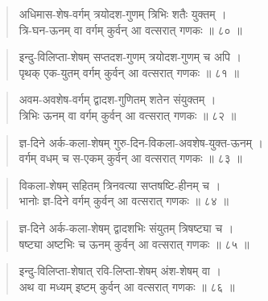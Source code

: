 \documentclass[11pt,a4paper]{article}
\newenvironment{shloka}{\begin{verse}\devanagarifont\large}{\end{verse}}
\begin{document}
\begin{shloka}
अधिमास-शेष-वर्गम् त्रयोदश-गुणम् त्रिभिः शतैः युक्तम् ।\\
त्रि-घन-ऊनम् वा वर्गम् कुर्वन् आ वत्सरात् गणकः ॥ ८० ॥
\end{shloka}

\vspace{0.3cm}

\begin{shloka}
इन्दु-विलिप्ता-शेषम् सप्तदश-गुणम् त्रयोदश-गुणम् च अपि ।\\
पृथक् एक-युतम् वर्गम् कुर्वन् आ वत्सरात् गणकः ॥ ८१ ॥
\end{shloka}

\vspace{0.3cm}

\begin{shloka}
अवम-अवशेष-वर्गम् द्वादश-गुणितम् शतेन संयुक्तम् ।\\
त्रिभिः ऊनम् वा वर्गम् कुर्वन् आ वत्सरात् गणकः ॥ ८२ ॥
\end{shloka}

\newpage

\vspace{0.3cm}

\begin{shloka}
ज्ञ-दिने अर्क-कला-शेषम् गुरु-दिन-विकला-अवशेष-युक्त-ऊनम् ।\\
वर्गम् वधम् च स-एकम् कुर्वन् आ वत्सरात् गणकः ॥ ८३ ॥
\end{shloka}

\vspace{0.3cm}

\begin{shloka}
विकला-शेषम् सहितम् त्रिनवत्या सप्तषष्टि-हीनम् च ।\\
भानोः ज्ञ-दिने वर्गम् कुर्वन् आ वत्सरात् गणकः ॥ ८४ ॥
\end{shloka}

\vspace{0.3cm}

\begin{shloka}
ज्ञ-दिने अर्क-कला-शेषम् द्वादशभिः संयुतम् त्रिषष्ट्या च ।\\
षष्ट्या अष्टभिः च ऊनम् कुर्वन् आ वत्सरात् गणकः ॥ ८५ ॥
\end{shloka}

\vspace{0.3cm}

\begin{shloka}
इन्दु-विलिप्ता-शेषात् रवि-लिप्ता-शेषम् अंश-शेषम् वा ।\\
अथ वा मध्यम् इष्टम् कुर्वन् आ वत्सरात् गणकः ॥ ८६ ॥
\end{shloka}
\end{document}
